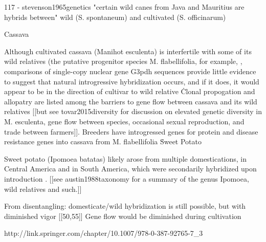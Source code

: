 \documentclass[11pt]{article}
\begin{document}
117 - stevenson1965genetics
    "certain wild canes from Java and Mauritius are hybrids between" wild (S. spontaneum) and cultivated (S. officinarum)















Cassava

Although cultivated cassava (Manihot esculenta) is interfertile with some of its wild relatives (the putative progenitor species M. flabellifolia, for example, \cite{roa1997aflp}\), comparisons of single-copy nuclear gene G3pdh sequences provide little evidence to suggest that natural introgressive hybridization occurs, and if it does, it would appear to be in the direction of cultivar to wild relative \cite{olsen1999evidence}\.
Clonal propogation and allopatry are listed among the barriers to gene flow between cassava and its wild relatives [[but see tovar2015diversity for discussion on elevated genetic diversity in M. esculenta, gene flow between species, occasional sexual reproduction, and trade between farmers]].
Breeders have introgressed genes for protein and disease resistance genes into cassava from M. flabellifolia \cite{akinbo2008introgression}\.



















Sweet Potato

Sweet potato (Ipomoea batatas) likely arose from multiple domestications, in Central America and in South America, which were secondarily hybridized upon introduction \cite{roullier2013disentangling}.  [[see austin1988taxonomy for a summary of the genus Ipomoea, wild relatives and such.]]

From disentangling:
domesticate/wild hybridization is still possible, but with diminished vigor [[50,55]]
Gene flow would be diminished during cultivation

http://link.springer.com/chapter/10.1007/978-0-387-92765-7_3
\end{document}
